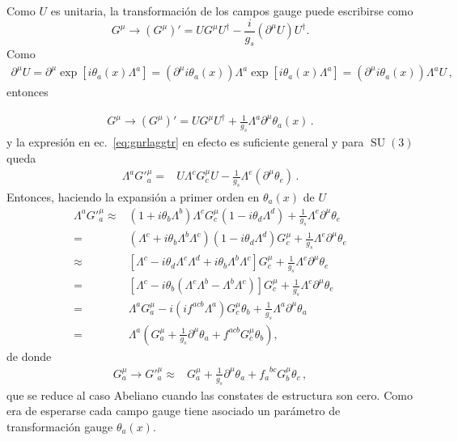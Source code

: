 Como $U$ es unitaria, la transformación de los campos gauge puede escribirse como
\begin{equation}
    {G}^\mu\to\left({G}^\mu\right)'=U{G}^\mu U^{\dagger}-\frac{i}{g_s}\left(\partial^\mu U\right)U^\dagger.
\end{equation}
Como
\begin{align}
  \partial^{\mu}U= \partial^{\mu}\exp\left[i\theta_a(x){\Lambda^a}\right]
  = \left( \partial^{\mu}i\theta_a(x)\right){\Lambda^a}\exp\left[i\theta_a(x){\Lambda^a}\right]
   = \left( \partial^{\mu}i\theta_a(x)\right){\Lambda^a}U\,,
\end{align}
entonces
\begin{frame}
\begin{align}
   {G}^\mu\to\left({G}^\mu\right)'=U{G}^\mu U^{\dagger}+\frac{1}{g_s}{\Lambda^a} \partial^{\mu}\theta_a(x)\,.
\end{align}
y la expresión en ec.~\eqref{eq:gnrlaggtr} en efecto es suficiente general y para $\operatorname{SU}(3)$ queda
\begin{align}
   \Lambda^a{G'}^\mu_a=&U\Lambda^cG^\mu_cU-\frac{1}{g_s}\Lambda^e(\partial^\mu\theta_e)\,.
\end{align}
Entonces, haciendo la expansión a primer orden en $\theta_{a}(x)$ de $U$
\begin{align}
\label{eq:Gmuinv}
  \Lambda^a{G'}^\mu_a\approx&(1+i\theta_b\Lambda^b)\Lambda^cG^\mu_c(1-i\theta_d\Lambda^d)+\frac{1}{g_s}\Lambda^e\partial^\mu\theta_e\nonumber\\
  =&(\Lambda^c+i\theta_b\Lambda^b\Lambda^c)(1-i\theta_d\Lambda^d)G^\mu_c+\frac{1}{g_s}\Lambda^e\partial^\mu\theta_e\nonumber\\
  \approx&[\Lambda^c-i\theta_d\Lambda^c\Lambda^d+i\theta_b\Lambda^b\Lambda^c]G^\mu_c+\frac{1}{g_s}\Lambda^e\partial^\mu\theta_e\nonumber\\
  =&[\Lambda^c-i\theta_b(\Lambda^c\Lambda^b-\Lambda^b\Lambda^c)]G^\mu_c+\frac{1}{g_s}\Lambda^e\partial^\mu\theta_e\nonumber\\
  =&\Lambda^aG^\mu_a-i(i f^{acb}\Lambda^a)G^\mu_c\theta_b+\frac{1}{g_s}\Lambda^a\partial^\mu\theta_a\nonumber\\
  =&\Lambda^a\left(G^\mu_a+\frac{1}{g_s}\partial^\mu\theta_a+f^{acb}G^\mu_c\theta_b\right),
\end{align}
de donde
\begin{align}
  \label{eq:gmutrinf}
  G^\mu_a\to {G'}^\mu_a\approx&G^\mu_a+\frac{1}{g_s}\partial^\mu\theta_a+{f_a}^{bc}G^\mu_b\theta_c\,,
\end{align}
que se reduce al caso Abeliano cuando las constates de estructura son cero. Como era de esperarse cada campo gauge tiene asociado un parámetro de transformación gauge $\theta_a(x)$.
\end{frame}

